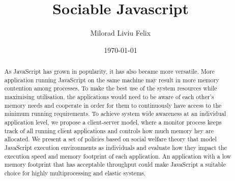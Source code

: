 \documentclass{l4proj}
\begin{document}
\title{Sociable Javascript}
\author{Milorad Liviu Felix}
\date{\today}
\maketitle
\educationalconsent
%
%
\newpage
\begin{abstract}
   As JavaScript has grown in popularity, it has also became more versatile. More application running JavaScript on the same machine may result in more memory contention among processes. To make the best use of the system resources while maximising utilisation, the applications would need to be aware of each other's memory needs and cooperate in order for them to continuously have access to the minimum running requirements. To achieve system wide awareness at an individual application level, we propose a client-server model, where a monitor process keeps track of all running client applications and controls how much memory hey are allocated. We present a set of policies based on social welfare theory that model JavaScript execution environments as individuals and evaluate how they impact the execution speed and memory footprint of each application. An application with a low memory footprint that has acceptable throughput could make JavaScript a suitable choice for highly multiprocessing and elastic systems.
\end{abstract}
\newpage

\tableofcontents

\newpage
\end{document}

